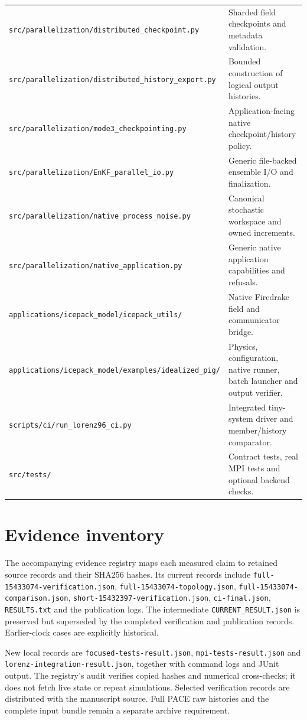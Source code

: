 \documentclass[11pt,a4paper]{article}
\newcommand{\code}[1]{\nolinkurl{#1}}
\begin{document}
\begin{longtable}{p{.49\linewidth}p{.44\linewidth}}
\code{src/parallelization/distributed_checkpoint.py} & Sharded field checkpoints and metadata validation.\\
\code{src/parallelization/distributed_history_export.py} & Bounded construction of logical output histories.\\
\code{src/parallelization/mode3_checkpointing.py} & Application-facing native checkpoint/history policy.\\
\code{src/parallelization/EnKF_parallel_io.py} & Generic file-backed ensemble I/O and finalization.\\
\code{src/parallelization/native_process_noise.py} & Canonical stochastic workspace and owned increments.\\
\code{src/parallelization/native_application.py} & Generic native application capabilities and refusals.\\
\code{applications/icepack_model/icepack_utils/} & Native Firedrake field and communicator bridge.\\
\code{applications/icepack_model/examples/idealized_pig/} & Physics, configuration, native runner, batch launcher and output verifier.\\
\code{scripts/ci/run_lorenz96_ci.py} & Integrated tiny-system driver and member/history comparator.\\
\code{src/tests/} & Contract tests, real MPI tests and optional backend checks.\\
\bottomrule
\end{longtable}
\normalsize

\section{Evidence inventory}
The accompanying evidence registry maps each measured claim to retained source records and their SHA256 hashes. Its current records include \code{full-15433074-verification.json}, \code{full-15433074-topology.json}, \code{full-15433074-comparison.json}, \code{short-15432397-verification.json}, \code{ci-final.json}, \code{RESULTS.txt} and the publication logs. The intermediate \code{CURRENT_RESULT.json} is preserved but superseded by the completed verification and publication records. Earlier-clock cases are explicitly historical.

New local records are \code{focused-tests-result.json}, \code{mpi-tests-result.json} and \code{lorenz-integration-result.json}, together with command logs and JUnit output. The registry's audit verifies copied hashes and numerical cross-checks; it does not fetch live state or repeat simulations. Selected verification records are distributed with the manuscript source. Full PACE raw histories and the complete input bundle remain a separate archive requirement.
\end{document}
